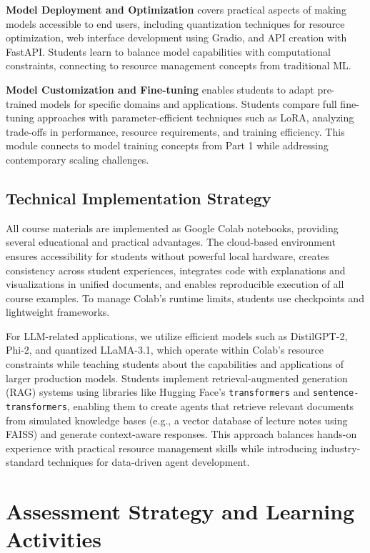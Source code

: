 \documentclass{article}
\begin{document}
\textbf{Model Deployment and Optimization} covers practical aspects of making models accessible to end users, including quantization techniques for resource optimization, web interface development using Gradio, and API creation with FastAPI. Students learn to balance model capabilities with computational constraints, connecting to resource management concepts from traditional ML.

\textbf{Model Customization and Fine-tuning} enables students to adapt pre-trained models for specific domains and applications. Students compare full fine-tuning approaches with parameter-efficient techniques such as LoRA, analyzing trade-offs in performance, resource requirements, and training efficiency. This module connects to model training concepts from Part 1 while addressing contemporary scaling challenges.

\subsection{Technical Implementation Strategy}

All course materials are implemented as Google Colab notebooks, providing several educational and practical advantages. The cloud-based environment ensures accessibility for students without powerful local hardware, creates consistency across student experiences, integrates code with explanations and visualizations in unified documents, and enables reproducible execution of all course examples. To manage Colab’s runtime limits, students use checkpoints and lightweight frameworks.

For LLM-related applications, we utilize efficient models such as DistilGPT-2, Phi-2, and quantized LLaMA-3.1, which operate within Colab’s resource constraints while teaching students about the capabilities and applications of larger production models. Students implement retrieval-augmented generation (RAG) systems using libraries like Hugging Face’s \texttt{transformers} and \texttt{sentence-transformers}, enabling them to create agents that retrieve relevant documents from simulated knowledge bases (e.g., a vector database of lecture notes using FAISS) and generate context-aware responses. This approach balances hands-on experience with practical resource management skills while introducing industry-standard techniques for data-driven agent development.

\section{Assessment Strategy and Learning Activities}
\end{document}
